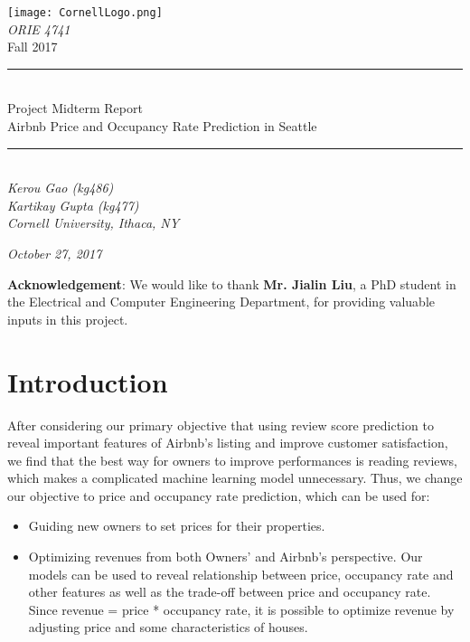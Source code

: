 \documentclass[12pt]{article}
\begin{document}
\rmfamily %

\begin{titlepage}
\begin{center}
\texttt{[image: CornellLogo.png]}\\[0.2cm]
\textsl{\LARGE ORIE 4741 }\\[0.5cm]
{\huge Fall 2017}\\[0.2cm]
\centering
\rule{\linewidth}{0.5mm}\\[0.4cm]
{\LARGE Project Midterm Report \\[0.4cm] Airbnb Price and Occupancy Rate Prediction in Seattle}
\rule{\linewidth}{0.5mm}\\[0.4cm]
\textsl{\Large  Kerou Gao (kg486)\\Kartikay Gupta (kg477)\\}
\vspace{5mm}
\textsl{\Large Cornell University, Ithaca, NY}

\textsl{\Large{October 27, 2017}}\\[9cm]

\end{center}

\noindent \textbf{Acknowledgement}: We would like to thank \textbf{Mr. Jialin Liu}, a PhD student in the Electrical and Computer Engineering Department, for providing valuable inputs in this project.

\end{titlepage}

\pagestyle{fancy}
\fancyhf{}
\setlength{\headheight}{50pt}
\renewcommand{\headrulewidth}{0.4pt}
\renewcommand{\footrulewidth}{0.4pt}
\cfoot{\thepage}



\section*{Introduction}
After considering our primary objective that using review score prediction to reveal important features of Airbnb's listing and improve customer satisfaction, we find that the best way for owners to improve performances is reading reviews, which makes a complicated machine learning model unnecessary. Thus, we change our objective to price and occupancy rate prediction, which can be used for:
\begin{itemize}
\item Guiding new owners to set prices for their properties.
\item Optimizing revenues from both Owners' and Airbnb's perspective. Our models can be used to reveal relationship between price, occupancy rate and other features as well as the trade-off between price and occupancy rate. Since revenue = price * occupancy rate, it is possible to optimize revenue by adjusting price and some characteristics of houses. 
\end{itemize}
\end{document}
